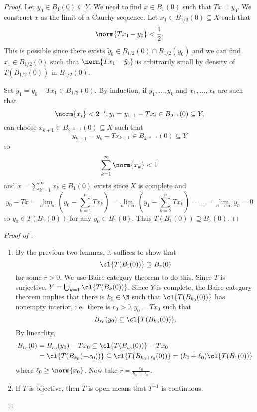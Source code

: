 \documentclass[a4paper]{article}
\begin{document}
\begin{proof}
  Let \(y_0 \in B_1(0) \subseteq Y\). We need to find \(x \in B_1(0)\) such that \(Tx = y_0\). We construct \(x\) as the limit of a Cauchy sequence. Let \(x_1 \in B_{1/2}(0) \subseteq X\) such that
  \[
    \norm{Tx_1 - y_0} < \frac{1}{2}.
  \]
  This is possible since there exists \(\tilde y_0 \in B_{1/2}(0) \cap B_{1/2}(y_0)\) and we can find \(x_1 \in B_{1/2}(0)\) such that \(\norm{Tx_1 - \tilde y_0}\) is arbitrarily small by density of \(T(B_{1/2}(0))\) in \(B_{1/2}(0)\).

  Set \(y_1 = y_0 - Tx_1 \in B_{1/2}(0)\). By induction, if \(y_1, \dots, y_k\) and \(x_1, \dots, x_k\) are such that
  \[
    \norm{x_i} < 2^{-i}, y_i = y_{i - 1} - Tx_i \in B_{2^{-i}}(0) \subseteq Y,
  \]
  can choose \(x_{k + 1} \in B_{2^{-k - 1}}(0) \subseteq X\) such that
  \[
    y_{k + 1} = y_k - Tx_{k + 1} \in B_{2^{-k - 1}}(0) \subseteq Y
  \]
  so
  \[
    \sum_{k = 1}^\infty \norm{x_k} < 1
  \]
  and \(x = \sum_{k = 1}^\infty x_k \in B_1(0)\) exists since \(X\) is complete and
  \[
    y_0 - Tx = \lim_{n \to \infty} \left( y_0 - \sum_{k = 1}^n Tx_k \right)
    = \lim_{n \to \infty} \left( y_1 - \sum_{k = 2}^n Tx_k \right)
    = \dots
    = \lim_{n \to \infty} y_n
    = 0
  \]
  so \(y_0 \in T(B_1(0))\) for any \(y_0 \in B_1(0)\). Thus \(T(B_1(0)) \supseteq B_1(0)\).
\end{proof}

\begin{proof}[Proof of ]\leavevmode
  \begin{enumerate}
  \item By the previous two lemmas, it suffices to show that
    \[
      \cl{T(B_1(0))} \supseteq B_r(0)
    \]
    for some \(r > 0\). We use Baire category theorem to do this. Since \(T\) is surjective, \(Y = \bigcup_{k = 1} \cl{T(B_k(0))}\). Since \(Y\) is complete, the Baire category theorem implies that there is \(k_0 \in \N\) such that \(\cl{T(B_{k_0}(0))}\) has nonempty interior, i.e.\ there is \(r_0 > 0, y_0 = Tx_0\) such that
    \[
      B_{r_0}(y_0) \subseteq \cl{T(B_{k_0}(0))}.
    \]
    By linearlity,
    \begin{align*}
      B_{r_0}(0)
      &= B_{r_0}(y_0) - Tx_0 \subseteq \cl{T(B_{k_0}(0))} - Tx_0 \\
      &= \cl{T(B_{k_0}(-x_0))} \subseteq \cl{T(B_{k_0 + \ell_0}(0))} = (k_0 + \ell_0) \cl{T(B_1(0))}
    \end{align*}
    where \(\ell_0 \geq \norm{x_0}\). Now take \(r = \frac{r_0}{k_0 + \ell_0}\).
  \item If \(T\) is bijective, then \(T\) is open means that \(T^{-1}\) is continuous.
  \end{enumerate}
\end{proof}
\end{document}
